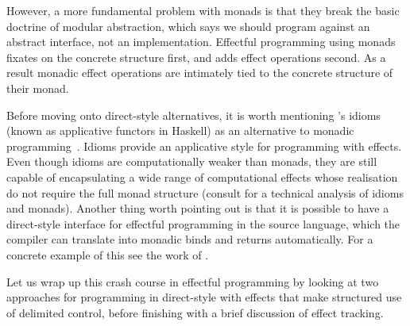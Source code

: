 \documentclass[12pt,phd,lfcs,twoside,openright,logo,leftchapter,normalheadings]{infthesis}
\theoremstyle{plain}
\theoremstyle{definition}
\begin{document}
However, a more fundamental problem with monads is that they break the
basic doctrine of modular abstraction, which says we should program
against an abstract interface, not an implementation. Effectful
programming using monads fixates on the concrete structure first, and
adds effect operations second. As a result monadic effect operations
are intimately tied to the concrete structure of their monad.

Before moving onto direct-style alternatives, it is worth mentioning
\citeauthor{McBrideP08}'s idioms (known as applicative functors in
Haskell) as an alternative to monadic
programming~\cite{McBrideP08}. Idioms provide an applicative style for
programming with effects. Even though idioms are computationally
weaker than monads, they are still capable of encapsulating a wide
range of computational effects whose realisation do not require the
full monad structure (consult \citet{Yallop10} for a technical
analysis of idioms and monads). Another thing worth pointing out is
that it is possible to have a direct-style interface for effectful
programming in the source language, which the compiler can translate
into monadic binds and returns automatically. For a concrete example
of this see the work of \citet{VazouL16}.

Let us wrap up this crash course in effectful programming by looking
at two approaches for programming in direct-style with effects that
make structured use of delimited control, before finishing with a
brief discussion of effect tracking.
\end{document}
